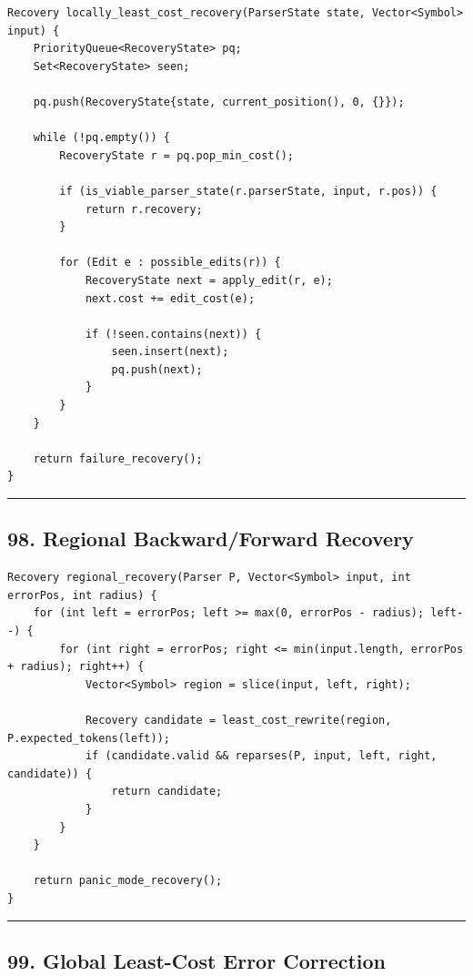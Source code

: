 \documentclass[10pt,letterpaper]{article}
\begin{document}
\begin{verbatim}
Recovery locally_least_cost_recovery(ParserState state, Vector<Symbol> input) {
    PriorityQueue<RecoveryState> pq;
    Set<RecoveryState> seen;

    pq.push(RecoveryState{state, current_position(), 0, {}});

    while (!pq.empty()) {
        RecoveryState r = pq.pop_min_cost();

        if (is_viable_parser_state(r.parserState, input, r.pos)) {
            return r.recovery;
        }

        for (Edit e : possible_edits(r)) {
            RecoveryState next = apply_edit(r, e);
            next.cost += edit_cost(e);

            if (!seen.contains(next)) {
                seen.insert(next);
                pq.push(next);
            }
        }
    }

    return failure_recovery();
}
\end{verbatim}

\medskip\hrule\medskip

\subsection*{98. Regional Backward/Forward Recovery}

\begin{verbatim}
Recovery regional_recovery(Parser P, Vector<Symbol> input, int errorPos, int radius) {
    for (int left = errorPos; left >= max(0, errorPos - radius); left--) {
        for (int right = errorPos; right <= min(input.length, errorPos + radius); right++) {
            Vector<Symbol> region = slice(input, left, right);

            Recovery candidate = least_cost_rewrite(region, P.expected_tokens(left));
            if (candidate.valid && reparses(P, input, left, right, candidate)) {
                return candidate;
            }
        }
    }

    return panic_mode_recovery();
}
\end{verbatim}

\medskip\hrule\medskip

\subsection*{99. Global Least-Cost Error Correction}
\end{document}
